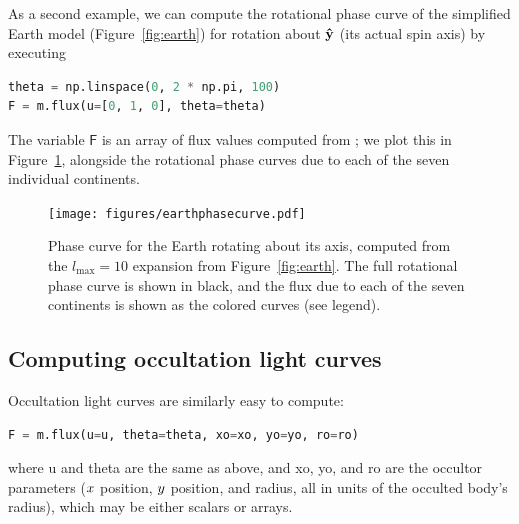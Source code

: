 \documentclass[modern]{aastex61}
\begin{document}
As a second example, we can compute the rotational phase curve of the simplified Earth model
(Figure~\ref{fig:earth}) for rotation about $\mathbf{\hat{y}}$ (its actual spin axis)
by executing
%
\begin{lstlisting}[language=Python,firstnumber=last]
theta = np.linspace(0, 2 * np.pi, 100)
F = m.flux(u=[0, 1, 0], theta=theta)
\end{lstlisting}
%
The variable $\textsf{F}$ is
an array of flux values computed from ; we plot this in
Figure~\ref{fig:earthphasecurve}, alongside the rotational phase curves due to each of
the seven individual continents.
%
\begin{figure}[ht!]
    \begin{centering}
    \texttt{[image: figures/earthphasecurve.pdf]}
    \caption{\label{fig:earthphasecurve}
             Phase curve for the Earth rotating about its axis, computed
             from the $l_\mathrm{max} = 10$ expansion from
             Figure~\ref{fig:earth}. The full rotational phase curve is shown in black,
             and the flux due to each of the seven continents is shown as
             the colored curves (see legend).}
    \end{centering}
\end{figure}
%

\subsection{Computing occultation light curves}
\label{sec:starryoccultation}

Occultation light curves are similarly easy to compute:
%
\begin{lstlisting}[language=Python,firstnumber=last]
F = m.flux(u=u, theta=theta, xo=xo, yo=yo, ro=ro)
\end{lstlisting}
%
where \textsf{u} and \textsf{theta} are the same as above, and
\textsf{xo}, \textsf{yo}, and \textsf{ro} are the occultor parameters
($\mbox{$x$}$ position, $\mbox{$y$}$ position, and radius, all in units of the
occulted body's radius), which may be either scalars
or arrays.

%
\end{document}

